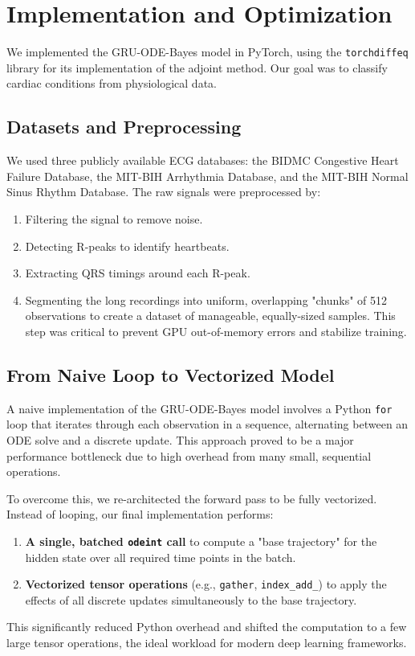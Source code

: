 \section{Implementation and Optimization}
\label{sec:implementation}

We implemented the GRU-ODE-Bayes model in PyTorch, using the \texttt{torchdiffeq} 
library for its implementation of the adjoint method. 
Our goal was to classify cardiac conditions from physiological data.

\subsection{Datasets and Preprocessing}

We used three publicly available ECG databases: 
the BIDMC Congestive Heart Failure Database, 
the MIT-BIH Arrhythmia Database, 
and the MIT-BIH Normal Sinus Rhythm Database. 
The raw signals were preprocessed by:
\begin{enumerate}
    \item Filtering the signal to remove noise.
    \item Detecting R-peaks to identify heartbeats.
    \item Extracting QRS timings around each R-peak.
    \item Segmenting the long recordings into uniform, overlapping "chunks" of 512 observations 
    to create a dataset of manageable, equally-sized samples. 
    This step was critical to prevent GPU out-of-memory errors and stabilize training.
\end{enumerate}

\subsection{From Naive Loop to Vectorized Model}
A naive implementation of the GRU-ODE-Bayes model involves a Python \texttt{for} 
loop that iterates through each observation in a sequence, alternating between an ODE solve and a discrete update. 
This approach proved to be a major performance bottleneck due to high overhead from many small, sequential operations.

To overcome this, we re-architected the forward pass to be fully vectorized. 
Instead of looping, our final implementation performs:
\begin{enumerate}
    \item \textbf{A single, batched \texttt{odeint} call} to compute a 
    "base trajectory" for the hidden state over all required time points in the batch.
    \item \textbf{Vectorized tensor operations} (e.g., \texttt{gather}, \texttt{index\_add\_}) 
    to apply the effects of all discrete updates simultaneously to the base trajectory.
\end{enumerate}

This significantly reduced Python overhead and shifted the computation to a few large tensor operations, 
the ideal workload for modern deep learning frameworks.